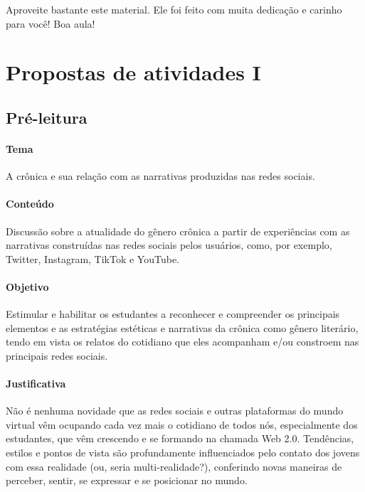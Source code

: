 \documentclass[a5]{article}
\begin{document}
Aproveite bastante este material. Ele foi feito com muita dedicação e
carinho para você! Boa aula!


\section{Propostas de atividades I}



\subsection{Pré-leitura}

\paragraph{Tema} A crônica e sua relação com as narrativas produzidas nas
  redes sociais.


\paragraph{Conteúdo} Discussão sobre a atualidade do gênero crônica a
partir de experiências com as narrativas construídas nas redes sociais
pelos usuários, como, por exemplo, Twitter, Instagram, TikTok e YouTube.

\paragraph{Objetivo} Estimular e habilitar os estudantes a reconhecer e
compreender os principais elementos e as estratégias estéticas e
narrativas da crônica como gênero literário, tendo em vista os relatos
do cotidiano que eles acompanham e/ou constroem nas principais redes
sociais.

\paragraph{Justificativa} Não é nenhuma novidade que as redes sociais e
outras plataformas do mundo virtual vêm ocupando cada vez mais o
cotidiano de todos nós, especialmente dos estudantes, que vêm crescendo
e se formando na chamada Web 2.0. Tendências, estilos e pontos de vista
são profundamente influenciados pelo contato dos jovens com essa
realidade (ou, seria multi-realidade?), conferindo novas maneiras de
perceber, sentir, se expressar e se posicionar no mundo.
\end{document}
